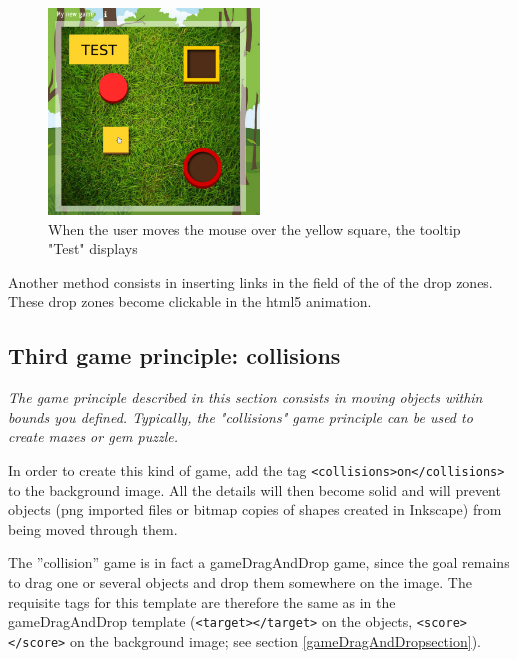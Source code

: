 \begin{figure}[htp]
 \centering
 \includegraphics[width=0.5\textwidth]{images/tooltip_example}
 \caption{When the user moves the mouse over the yellow square, the tooltip "Test" displays}
 \label{tooltip_example}
\end{figure}

Another method consists in inserting links in the  field of the  
of the drop zones. These drop zones become clickable in the html5 animation.

\subsection{Third game principle: collisions}

\textit{The game principle described in this section consists in moving objects
within bounds you defined. Typically, the "collisions" game principle
can be used to create mazes or gem puzzle.}




In order to create this kind of game, add the tag \verb|<collisions>on</collisions>| to the 
background image. All the details will then become solid and will prevent objects 
(png imported files or bitmap copies of shapes created in Inkscape) from being moved through them.

The ''collision'' game is in fact a gameDragAndDrop game, since the goal remains to 
drag one or several objects and drop them somewhere on the image.
The requisite tags for this template are 
therefore the same as in the gameDragAndDrop template (\verb|<target></target>| on the objects, \verb|<score></score>| 
on the background image; see section \ref{gameDragAndDropsection}).

